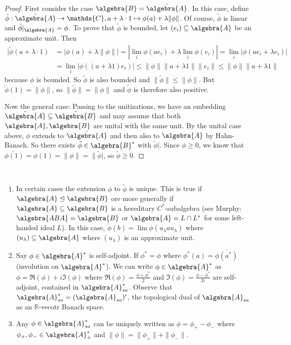 \documentclass[a4paper]{article}
\begin{document}
\begin{proof}
	First consider the case $\algebra{B} = \tilde{\algebra{A}}$.
	In this case, define $\tilde{\phi}: \tilde{\algebra{A}} \to \mathds{C}, a + \lambda \cdot 1 \mapsto \phi(a) + \lambda \|\phi\|$.
	Of course, $\tilde{\phi}$ is linear and $\tilde{\phi}|_\algebra{A} = \phi$. 
	To prove that $\tilde{\phi}$ is bounded, let $(e_i) \subseteq \algebra{A}$ be an approximate unit. Then
	\begin{align*}
		|\tilde{\phi}(a + \lambda \cdot 1) &= |\phi(a) + \lambda \|\phi\| | = |\lim_i \phi(a e_i) + \lambda \lim_i \phi(e_i)| = \lim_i |\phi(a e_i + \lambda e_i)|\\ 
		&= \lim_i |\phi((a + \lambda 1) e_i)| \leq \|\phi\| \| a + \lambda 1 \| \|e_i\| \leq \|\phi\| \|a + \lambda 1\|
	\end{align*}
	because $\phi$ is bounded.
	So $\tilde{\phi}$ is also bounded and $\|\tilde{\phi}\| \leq \|\phi\|$.
	But $\tilde{\phi}(1) = \|\phi\|$, so $\|\tilde{\phi}\| = \|\phi\|$ and $\tilde{\phi}$ is therefore also positive.

	Now the general case: Passing to the unitizations, we have an embedding $\tilde{\algebra{A}} \subseteq \tilde{\algebra{B}}$ and may assume that both $\algebra{A}, \algebra{B}$ are unital with the same unit.
	By the unital case above, $\phi$ extends to $\tilde{\algebra{A}}$ and then also to $\algebra{A}$ by Hahn-Banach. 
	So there exists $\tilde{\phi} \in \algebra{B}^*$ with $\tilde{\phi}|$.
	Since $\phi \geq 0$, we know that $\tilde{\phi(1)} = \phi(1) = \|\phi\| = \|\tilde{\phi}|$, so $\tilde{\phi} \geq 0$.
\end{proof}

\begin{remark}~
	\begin{enumerate}
		\item In certain cases the extension $\phi$ to $\tilde{\phi}$ is unique.
		This is true if $ \algebra{A} \trianglelefteq \algebra{B}$ ore more generally if $\algebra{A} \subseteq \algebra{B}$ is a hereditary $C^*$-subalgebra (see Murphy: $\algebra{ABA} = \algebra{B}$ or $\algebra{A} = L \cap L^*$ for some left-handed ideal $L$).
		In this case, $\tilde{\phi}(b) = \lim \phi(u_\lambda a u_\lambda)$ where $(u_\lambda) \subseteq \algebra{A}$ where $(u_\lambda)$ is an approximate unit.
		\item Say $\phi \in \algebra{A}^*$ is self-adjoint. If $\phi^* = \phi$ where $\phi^*(a) = \overline{\phi(a^*)}$ (involution on $\algebra{A}^*$).
		We can write $\phi \in \algebra{A}^*$ as $\phi = \Re(\phi) + i \Im(\phi)$ where $\Re(\phi) = \frac{\phi + \phi^*}{2}$ and $\Im(\phi) = \frac{\phi - \phi^*}{2i}$ are self-adjoint, contained in $\algebra{A}^*_{sa}$.
		Observe that $\algebra{A}_{sa}^* = (\algebra{A}_{sa})'$, the topological dual of $\algebra{A}_{sa}$ as an $\mathds{R}$-vecotr Banach space.
		\item Any $\phi \in \algebra{A}_{sa}^*$ can be uniquely written as $\phi = \phi_+ - \phi_-$ where $\phi_+, \phi_- \in \algebra{A}_+^*$ and $\|\phi\| = \|\phi_+\| + \|\phi_-\|$.
	\end{enumerate}
\end{remark}
\end{document}
